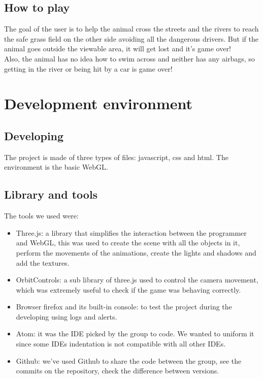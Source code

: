 \documentclass[a4paper, 11pt]{article}
\begin{document}
\subsection{How to play}
The goal of the user is to help the animal cross the streets and the rivers to reach the safe grass field on the other side avoiding all the dangerous drivers. But if the animal goes outside the viewable area, it will get lost and it's game over!\\
Also, the animal has no idea how to swim across and neither has any airbags, so getting in the river or being hit by a car is game over!

\section{Development environment}
\subsection{Developing}
The project is made of three types of files: javascript, css and html. The environment is 
the basic WebGL. 
\subsection{Library and tools}
The tools we used were:
\begin{itemize}
\item Three.js: a library that simplifies the interaction between the programmer and WebGL, this was used to create the scene with all the objects in it, perform the movements of the animations, create the lights and shadows and add the textures.
\item OrbitControls: a sub library of three.js used to control the camera movement, which was extremely useful to check if the game was behaving correctly.
\item Browser firefox and its built-in console: to test the project during the developing using logs and alerts.
\item Atom: it was the IDE picked by the group to code. We wanted to uniform it since some IDEs indentation is not compatible with all other IDEs.
\item Github: we've used Github to share the code between the group, see the commits on the repository, check the difference between versions.
\end{itemize}
\newpage
\end{document}
